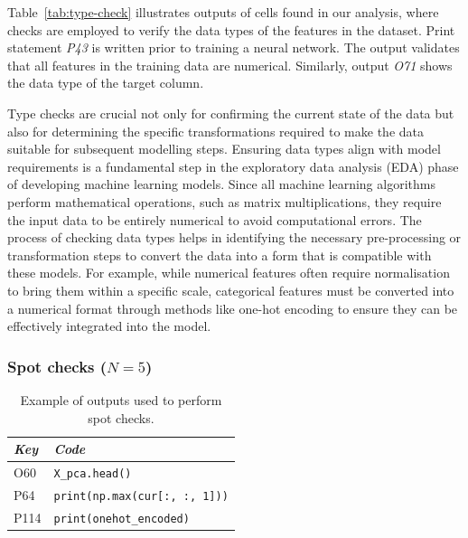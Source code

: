 Table~\ref{tab:type-check} illustrates outputs of cells found in our analysis, where checks are employed to verify the data types of the features in the dataset. Print statement \emph{P43} is written prior to training a neural network. The output validates that all features in the training data are numerical. Similarly, output \emph{O71} shows the data type of the target column.

Type checks are crucial not only for confirming the current state of the data but also for determining the specific transformations required to make the data suitable for subsequent modelling steps. Ensuring data types align with model requirements is a fundamental step in the exploratory data analysis (EDA) phase of developing machine learning models. Since all machine learning algorithms perform mathematical operations, such as matrix multiplications, they require the input data to be entirely numerical to avoid computational errors. The process of checking data types helps in identifying the necessary pre-processing or transformation steps to convert the data into a form that is compatible with these models. For example, while numerical features often require normalisation to bring them within a specific scale, categorical features must be converted into a numerical format through methods like one-hot encoding to ensure they can be effectively integrated into the model.


\subsubsection{Spot checks ($N = 5$)}

\begin{table}
  \centering
  \caption{Example of outputs used to perform spot checks.}
  \begin{tabular}{@{}m{} m{}@{}}
    \toprule
    \emph{\textbf{Key}}&
    \emph{\textbf{Code}}\\
    \midrule

    O60 &
    \lstinline[]$X_pca.head()$\\

    P64 &
    \lstinline[]$print(np.max(cur[:, :, 1]))$\\

    P114 &
    \lstinline[]$print(onehot_encoded)$\\
    \bottomrule
  \end{tabular}
  \label{tab:spot-check}
\end{table}

